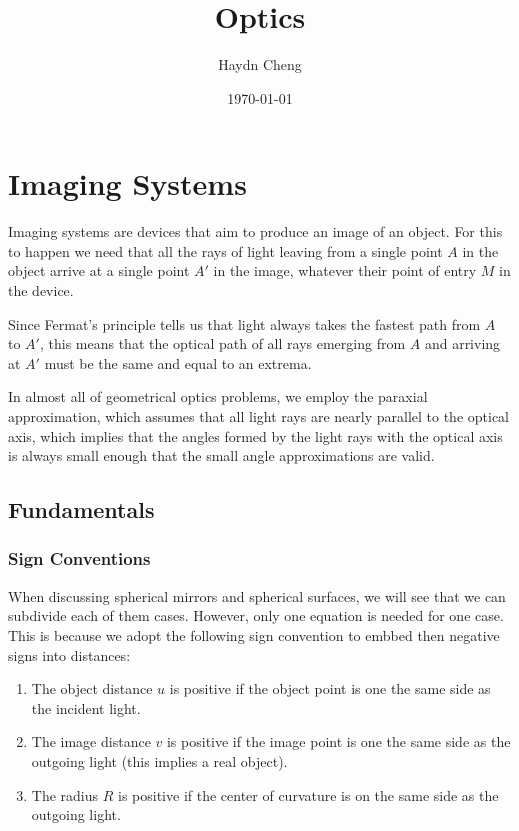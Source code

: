 \documentclass[english,a4paper,12pt]{report}
\title{Optics}
\author{Haydn Cheng}
\date{\today}
\begin{document}
\maketitle
\tableofcontents
    
\chapter{Imaging Systems}

Imaging systems are devices that aim to produce an image of an object. For this to happen we need that all the rays of light leaving from a single point \(A\) in the object arrive at a single point \(A'\) in the image, whatever their point of entry \(M\) in the device. 

Since Fermat's principle tells us that light always takes the fastest path from \(A\) to \(A'\), this means that the optical path of all rays emerging from \(A\) and arriving at \(A'\) must be the same and equal to an extrema.   

In almost all of geometrical optics problems, we employ the paraxial approximation, which assumes that all light rays are nearly parallel to the optical axis, which implies that the angles formed by the light rays with the optical axis is always small enough that the small angle approximations are valid.

\section{Fundamentals}

\subsection{Sign Conventions}

When discussing spherical mirrors and spherical surfaces, we will see that we can subdivide each of them cases. However, only one equation is needed for one case. This is because we adopt the following sign convention to embbed then negative signs into distances:

\begin{enumerate}
    \item The object distance \(u\) is positive if the object point is one the same side as the incident light.
    \item The image distance \(v\) is positive if the image point is one the same side as the outgoing light (this implies a real object).
    \item The radius \(R\) is positive if the center of curvature is on the same side as the outgoing light.
\end{enumerate}
\end{document}

